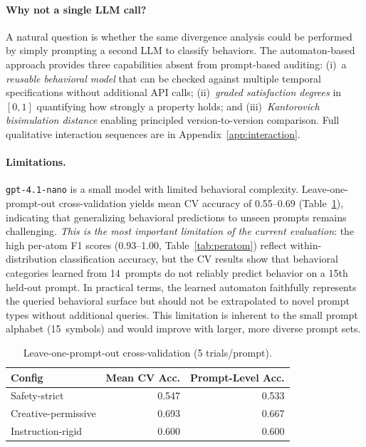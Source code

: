 \documentclass[11pt]{article}
\begin{document}
\paragraph{Why not a single LLM call?}
A natural question is whether the same divergence analysis could be
performed by simply prompting a second LLM to classify behaviors.
The automaton-based approach provides three capabilities absent from
prompt-based auditing: (i)~a \emph{reusable behavioral model} that
can be checked against multiple temporal specifications without
additional API calls; (ii)~\emph{graded satisfaction degrees} in
$[0,1]$ quantifying how strongly a property holds; and
(iii)~\emph{Kantorovich bisimulation distance} enabling principled
version-to-version comparison.  Full qualitative interaction
sequences are in Appendix~\ref{app:interaction}.

\paragraph{Limitations.}
\texttt{gpt-4.1-nano} is a small model with limited behavioral
complexity.  Leave-one-prompt-out cross-validation yields
mean CV accuracy of 0.55--0.69 (Table~\ref{tab:cv}), indicating
that generalizing behavioral predictions to unseen prompts remains
challenging.  \emph{This is the most important limitation of the
current evaluation}: the high per-atom F1 scores (0.93--1.00,
Table~\ref{tab:peratom}) reflect within-distribution classification
accuracy, but the CV results show that behavioral categories
learned from 14~prompts do not reliably predict behavior on a
15th held-out prompt.  In practical terms, the learned automaton
faithfully represents the queried behavioral surface but should
not be extrapolated to novel prompt types without additional queries.
This limitation is inherent to the small prompt alphabet (15~symbols)
and would improve with larger, more diverse prompt sets.

\begin{table}[t]
\centering
\caption{Leave-one-prompt-out cross-validation (5 trials/prompt).}
\label{tab:cv}
\small
\begin{tabular}{@{}lrr@{}}
\toprule
\textbf{Config} & \textbf{Mean CV Acc.} & \textbf{Prompt-Level Acc.} \\
\midrule
Safety-strict       & 0.547 & 0.533 \\
Creative-permissive & 0.693 & 0.667 \\
Instruction-rigid   & 0.600 & 0.600 \\
\bottomrule
\end{tabular}
\end{table}
\end{document}
